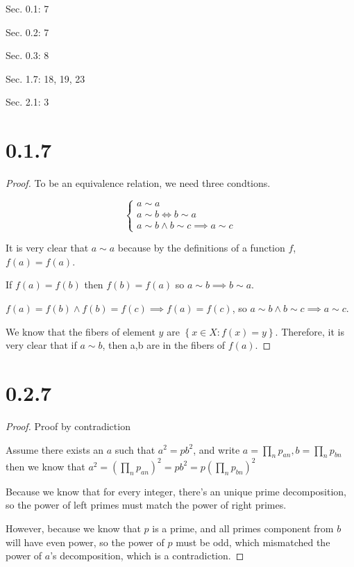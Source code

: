\documentclass[11pt]{article}
\begin{document}


\begin{center}
\end{center}



Sec. 0.1: 7

Sec. 0.2: 7

Sec. 0.3: 8

Sec. 1.7: 18, 19, 23

Sec. 2.1: 3


\section*{0.1.7}

\begin{proof}
	To be an equivalence relation, we need three condtions.

	$$
		\begin{cases}
			a \sim a               \\
			a \sim b \iff b \sim a \\
			a \sim b \land b \sim c \implies a \sim c
		\end{cases}
	$$

	It is very clear that $a \sim a$ because by the definitions of a function $f$, $f(a)=f(a)$.

	If $f(a)=f(b)$ then $f(b)=f(a)$ so $a \sim b \implies b \sim a$.

	$f(a)=f(b)\land f(b)=f(c)\implies f(a)=f(c)$, so $a \sim b \land b \sim c \implies a \sim c$.

	We know that the fibers of element $y$ are $\left\{ x \in X : f(x) = y \right\}$.
	Therefore, it is very clear that if $a \sim b$, then a,b are in the fibers of $f(a)$.
\end{proof}

\section*{0.2.7}

\begin{proof}
	Proof by contradiction

	Assume there exists an $a$ such that $a^2=pb^2$,
	and write $a=\prod_{n}^{} p_{an}, b=\prod_{n}^{} p_{bn}  $
	then we know that $a^2=\left( \prod_{n}^{} p_{an} \right)^2 = pb^2 = p(\prod_{n}^{} p_{bn})^2$

	Because we know that for every integer, there's an unique prime decomposition, so the power of
	left primes must match the power of right primes.

	However, because we know that $p$ is a prime, and all primes component from $b$ will have even power,
	so the power of $p$ must be odd, which mismatched the power of $a$'s decomposition, which is a contradiction.
\end{proof}
\end{document}
